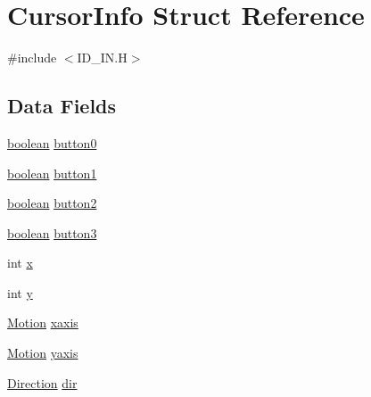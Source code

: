 \hypertarget{structCursorInfo}{
\section{CursorInfo Struct Reference}
\label{structCursorInfo}
}


{\ttfamily \#include $<$ID\_\-IN.H$>$}

\subsection*{Data Fields}
\begin{DoxyCompactItemize}
\item 
\hyperlink{ID__HEAD_8H_a7c6368b321bd9acd0149b030bb8275ed}{boolean} \hyperlink{structCursorInfo_ae7deceedd0dce4d2518beba974af07e7}{button0}
\item 
\hyperlink{ID__HEAD_8H_a7c6368b321bd9acd0149b030bb8275ed}{boolean} \hyperlink{structCursorInfo_ae0523475385f94ce9a8bc700b416cc2b}{button1}
\item 
\hyperlink{ID__HEAD_8H_a7c6368b321bd9acd0149b030bb8275ed}{boolean} \hyperlink{structCursorInfo_acda576be19093afa33bb2bbb6c56cc81}{button2}
\item 
\hyperlink{ID__HEAD_8H_a7c6368b321bd9acd0149b030bb8275ed}{boolean} \hyperlink{structCursorInfo_a380e928473ed792067482a7681d6c692}{button3}
\item 
int \hyperlink{structCursorInfo_af8d06085a2a89d8bd08d98372478285b}{x}
\item 
int \hyperlink{structCursorInfo_a5751ef88d47979695f38ab09c8816a2d}{y}
\item 
\hyperlink{ID__IN_8H_a099c889d2b948b264c7a665b66e3a9b6}{Motion} \hyperlink{structCursorInfo_a9e7b5228ce18aa4b85fab9c917eb7395}{xaxis}
\item 
\hyperlink{ID__IN_8H_a099c889d2b948b264c7a665b66e3a9b6}{Motion} \hyperlink{structCursorInfo_a588feac2695a14f7448c7bdcae200ba5}{yaxis}
\item 
\hyperlink{ID__IN_8H_a224b9163917ac32fc95a60d8c1eec3aa}{Direction} \hyperlink{structCursorInfo_a77984236aaeace15653f8a35fcaefd57}{dir}
\end{DoxyCompactItemize}


